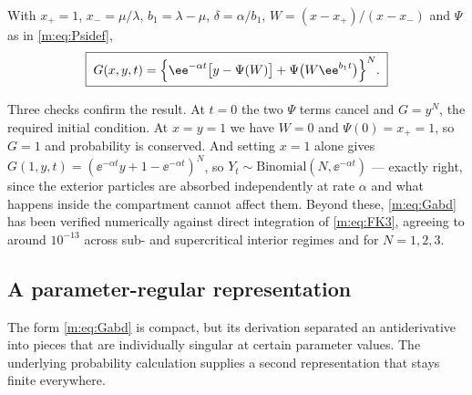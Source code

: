 \begin{proposition}
\label{m:prop:Gabd}
With $x_+=1$, $x_-=\mu/\lambda$, $b_1=\lambda-\mu$, $\delta=\alpha/b_1$,
$W = (x-x_+)/(x-x_-)$ and $\Psi$ as in \cref{m:eq:Psidef},
\begin{equation}
\label{m:eq:Gabd}
\boxed{\;
G(x,y,t) = \Bigl\{\ee^{-\alpha t}\bigl[y-\Psi(W)\bigr] + \Psi\bigl(W\ee^{b_1t}\bigr)\Bigr\}^{N} . \;}
\end{equation}
\end{proposition}

Three checks confirm the result. At $t=0$ the two $\Psi$ terms cancel and $G=y^N$,
the required initial condition. At $x=y=1$ we have $W=0$ and $\Psi(0)=x_+=1$, so
$G=1$ and probability is conserved. And setting $x=1$ alone gives
$G(1,y,t) = (\ee^{-\alpha t}y+1-\ee^{-\alpha t})^N$, so
$Y_t\sim\text{Binomial}(N,\ee^{-\alpha t})$ --- exactly right, since the exterior
particles are absorbed independently at rate $\alpha$ and what happens inside the
compartment cannot affect them. Beyond these, \cref{m:eq:Gabd} has been verified
numerically against direct integration of \cref{m:eq:FK3}, agreeing to around
$10^{-13}$ across sub- and supercritical interior regimes and for $N=1,2,3$.

\subsection{A parameter-regular representation}
\label{m:app:abdregular}

The form \cref{m:eq:Gabd} is compact, but its derivation separated an antiderivative
into pieces that are individually singular at certain parameter values. The
underlying probability calculation supplies a second representation that stays
finite everywhere.

